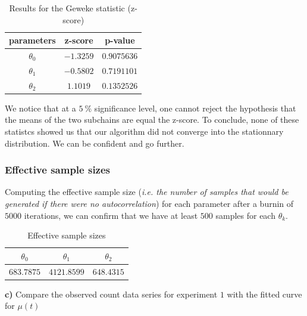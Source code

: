 \begin{table}[H]
	\centering\begin{tabular}{|c|c|c|} \hline 
		parameters & z-score & p-value \\ \hline
		$\theta_0$ & $-1.3259$ & $0.9075636$ \\
		$\theta_1$ & $-0.5802$ & $0.7191101$ \\
		$\theta_2$ & $1.1019$ &  $0.1352526$ \\ \hline
	\end{tabular}
	\caption{Results for the Geweke statistic (z-score)}
	\label{tab:metropolis-cw-geweke}
\end{table}

We notice that at a $\SI{5}{\percent}$ significance level, one cannot reject the hypothesis that the means of the two subchains are equal the z-score. To conclude, none of these statistcs showed us that our algorithm did not converge into the stationnary distribution. We can be confident and go further.


\subsubsection*{Effective sample sizes}

Computing the effective sample size (\textit{i.e. the number of samples that would be generated if there were no autocorrelation}) for each parameter after a burnin of $5000$ iterations, we can confirm that we have at least $500$ samples for each $\theta_k$.

\begin{table}[H]
	\centering\begin{tabular}{|c|c|c|} \hline 
		$\theta_0$ & $\theta_1$ & $\theta_2$ \\ \hline 
		$683.7875$  & $4121.8599$ & $648.4315$   \\ \hline
	\end{tabular}
	\caption{Effective sample sizes}
	\label{tab:metropolis-cw-effective-sample-sizes}
\end{table}

\textbf{c)} Compare the observed count data series for experiment $1$ with the fitted curve for $\mu(t)$

